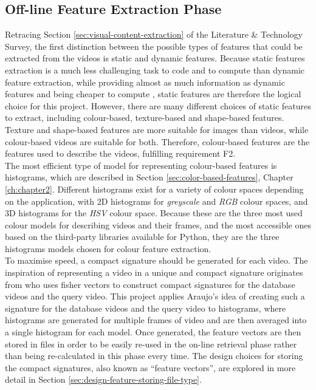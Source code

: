 
\subsection{Off-line Feature Extraction Phase}
\label{sec:design-offline-feature-extraction}

Retracing Section \ref{sec:visual-content-extraction} of the Literature \& Technology Survey, the first distinction between the possible types of features that could be extracted from the videos is static and dynamic features. Because static features extraction is a much less challenging task to code and to compute than dynamic feature extraction, while providing almost as much information as dynamic features and being cheaper to compute \cite{hu2011survey}, static features are therefore the logical choice for this project. However, there are many different choices of static features to extract, including colour-based, texture-based and shape-based features. Texture and shape-based features are more suitable for images than videos, while colour-based videos are suitable for both. Therefore, colour-based features are the features used to describe the videos, fulfilling requirement F2.\\

The most efficient type of model for representing colour-based features is histograms, which are described in Section \ref{sec:color-based-features}, Chapter \ref{ch:chapter2}. Different histograms exist for a variety of colour spaces depending on the application, with 2D histograms for \textit{greyscale} and \textit{RGB} colour spaces, and 3D histograms for the \textit{HSV} colour space. Because these are the three most used colour models for describing videos and their frames, and the most accessible ones based on the third-party libraries available for Python, they are the three histograms models chosen for colour feature extraction.\\ 

To maximise speed, a compact signature should be generated for each video. The inspiration of representing a video in a unique and compact signature originates from \cite{araujo2017i2v} who uses fisher vectors to construct compact signatures for the database videos and the query video. This project applies Araujo's idea of creating such a signature for the database videos and the query video to histograms, where histograms are generated for multiple frames of video and are then averaged into a single histogram for each model. Once generated, the feature vectors are then stored in files in order to be easily re-used in the on-line retrieval phase rather than being re-calculated in this phase every time. The design choices for storing the compact signatures, also known as ``feature vectors'', are explored in more detail in Section \ref{sec:design-feature-storing-file-type}. 

